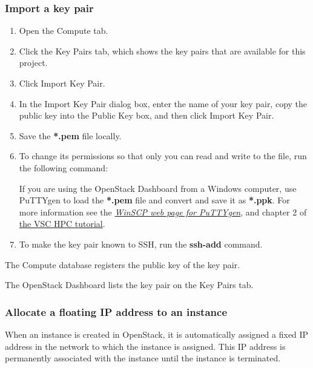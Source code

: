 \subsubsection{Import a key pair}\label{import-a-key-pair}

\begin{enumerate}
\item Open the Compute tab.
\item Click the Key Pairs tab, which shows the key pairs that are
  available for this project.
\item Click Import Key Pair.
\item In the Import Key Pair dialog box, enter the name of your key
  pair, copy the public key into the Public Key box, and then click
  Import Key Pair.
\item Save the \textbf{*.pem} file locally.
\item To change its permissions so that only you can read and write to
  the file, run the following command:

  \begin{prompt}
  \end{prompt}

   If you are using the \gls{OpenStack Dashboard} from a
  Windows computer, use PuTTYgen to load the \textbf{*.pem} file and
  convert and save it as \textbf{*.ppk}.  For more information see the
  \href{https://winscp.net/eng/docs/ui_puttygen}{\emph{WinSCP web page
      for PuTTYgen}}, and chapter 2 of
  \href{https://www.vscentrum.be/support/tut-book/vsc-tutorials}{the
    VSC HPC tutorial}.

\item To make the key pair known to SSH, run the \textbf{ssh-add}
  command.

  \begin{prompt}
  \end{prompt}
\end{enumerate}

The Compute database registers the public key of the key pair.

The \gls{OpenStack Dashboard} lists the key pair on the Key Pairs tab.

\subsubsection{Allocate a floating IP address to an instance}\label{allocate-a-floating-ip-address-to-an-instance}
When an instance is created in \gls{OpenStack}, it is automatically
assigned a fixed IP address in the network to which the instance is
assigned. This IP address is permanently associated with the instance
until the instance is terminated.

